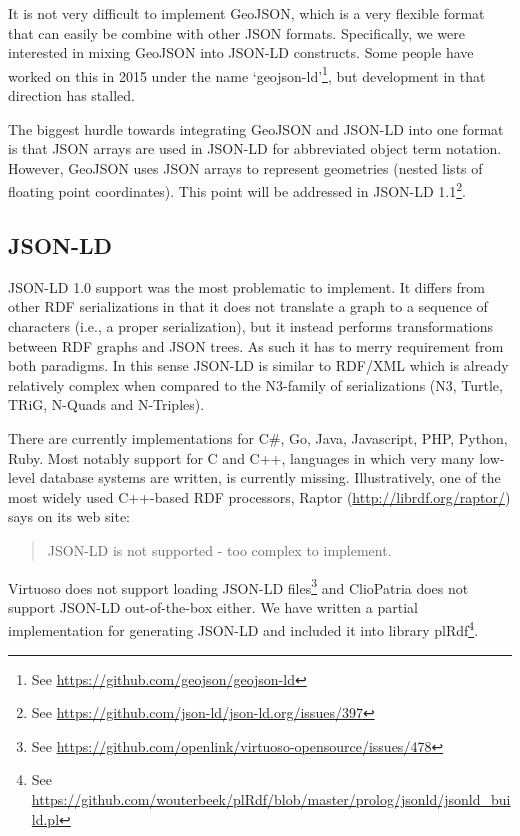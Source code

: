 \documentclass[a4paper]{scrartcl}
\begin{document}
It is not very difficult to implement GeoJSON, which is a very
flexible format that can easily be combine with other JSON formats.
Specifically, we were interested in mixing GeoJSON into JSON-LD
constructs.  Some people have worked on this in 2015 under the name
`geojson-ld'\footnote{See
  \url{https://github.com/geojson/geojson-ld}}, but development in
that direction has stalled.

The biggest hurdle towards integrating GeoJSON and JSON-LD into one
format is that JSON arrays are used in JSON-LD for abbreviated object
term notation.  However, GeoJSON uses JSON arrays to represent
geometries (nested lists of floating point coordinates).
This point will be addressed in JSON-LD 1.1\footnote{See \url{https://github.com/json-ld/json-ld.org/issues/397}}.


\subsection{JSON-LD}
\label{sec:jsonld}

JSON-LD 1.0 support was the most problematic to implement.  It differs
from other RDF serializations in that it does not translate a graph to
a sequence of characters (i.e., a proper serialization), but it
instead performs transformations between RDF graphs and JSON trees.
As such it has to merry requirement from both paradigms.  In this
sense JSON-LD is similar to RDF/XML which is already relatively
complex when compared to the N3-family of serializations (N3, Turtle,
TRiG, N-Quads and N-Triples).

There are currently implementations for C\#, Go, Java, Javascript,
PHP, Python, Ruby.  Most notably support for C and C++, languages in
which very many low-level database systems are written, is currently
missing.  Illustratively, one of the most widely used C++-based RDF
processors, Raptor (\url{http://librdf.org/raptor/}) says on its web
site:

\begin{quote}
  JSON-LD is not supported - too complex to implement.
\end{quote}

Virtuoso does not support loading JSON-LD files\footnote{See
  \url{https://github.com/openlink/virtuoso-opensource/issues/478}}
and ClioPatria does not support JSON-LD out-of-the-box either.  We
have written a partial implementation for generating JSON-LD and
included it into library plRdf\footnote{See
  \url{https://github.com/wouterbeek/plRdf/blob/master/prolog/jsonld/jsonld_build.pl}}.
\end{document}
